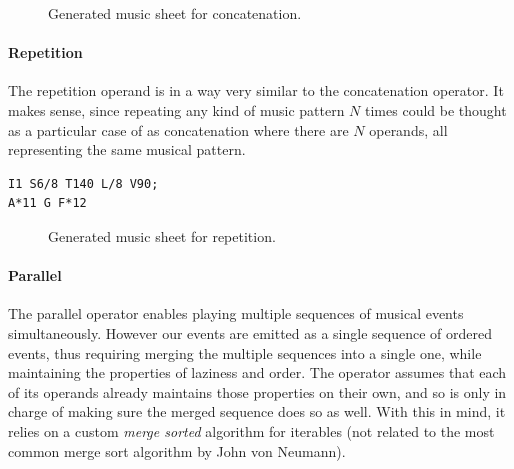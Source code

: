 \documentclass[a4paper,UKenglish,cleveref, autoref]{oasics-v2019}
\begin{document}
\begin{figure}[ht]
  \centering
  {%
  \setlength{\fboxsep}{0pt}%
  \setlength{\fboxrule}{0pt}%
  }%
  \caption{Generated music sheet for concatenation\protect\footnotemark.}
  \label{fig:concatenation}
\end{figure}



\paragraph*{Repetition}
The repetition operand is in a way very similar to the concatenation operator. It makes sense, since repeating any kind of music pattern $N$ times could be thought as a particular case of as concatenation where there are $N$ operands, all representing the same musical pattern.

\begin{lstlisting}[caption={Intro to Westworld's Theme by Ramin Djawadi},label=list:5,captionpos=t,abovecaptionskip=-\medskipamount]
I1 S6/8 T140 L/8 V90;
A*11 G F*12
\end{lstlisting}

\begin{figure}[ht]
  \centering
  {%
  \setlength{\fboxsep}{0pt}%
  \setlength{\fboxrule}{0pt}%
  }%
  \caption{Generated music sheet for repetition.}
  \label{fig:repetition}
\end{figure}

\paragraph*{Parallel}
The parallel operator enables playing multiple sequences of musical events simultaneously. However our events are emitted as a single sequence of ordered events, thus requiring merging the multiple sequences into a single one, while maintaining the properties of laziness and order. The operator assumes that each of its operands already maintains those properties on their own, and so is only in charge of making sure the merged sequence does so as well. With this in mind, it relies on a custom \textit{merge sorted} algorithm for iterables (not related to the most common merge sort algorithm by John von Neumann).
\end{document}
